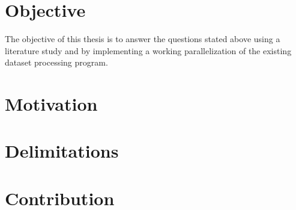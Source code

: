 \section{Objective}
The objective of this thesis is to answer the questions stated above using a literature study and by implementing a working parallelization
of the existing dataset processing program.

\section{Motivation}

\section{Delimitations}

\section{Contribution}
